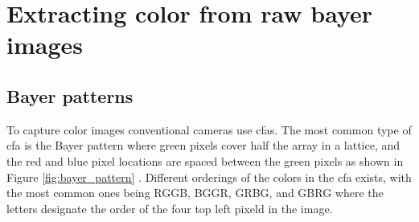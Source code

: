 \section{Extracting color from raw bayer images}
\subsection{Bayer patterns}
To capture color images conventional cameras use \glspl{cfa}.
The most common type of \gls{cfa} is the Bayer pattern where green pixels cover half the array in a lattice, and the red and blue pixel locations are spaced between the green pixels as shown in Figure \ref{fig:bayer_pattern} \cite{getreuerMalvarHeCutlerLinearImage2011}.
Different orderings of the colors in the \gls{cfa} exists, with the most common ones being RGGB, BGGR, GRBG, and GBRG where the letters designate the order of the four top left pixeld in the image.

